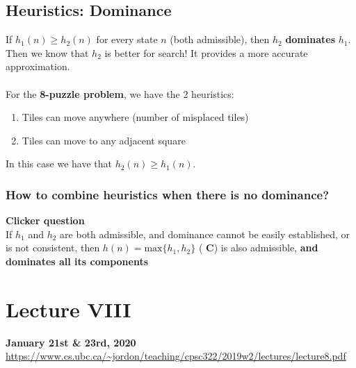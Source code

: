 \documentclass{article}
\theoremstyle{definition}
\begin{document}
\subsection*{Heuristics: Dominance}
If $ h_1(n) \geq h_2(n) $ for every state $ n $ (both admissible), then $ h_2 $ \textbf{\color{blue} dominates} $ h_1 $. Then we know that $ h_2 $ is better for search! It provides a more accurate approximation. \\ \\
For the \textbf{8-puzzle problem}, we have the 2 heuristics:
\begin{enumerate}
	\item Tiles can move anywhere (number of misplaced tiles)
	\item Tiles can move to any adjacent square
\end{enumerate}
In this case we have that $ h_2(n) \geq h_1(n) $. 

\subsubsection*{How to combine heuristics when there is no dominance?}
\textbf{\color{Dandelion} Clicker question}\\ If $ h_1 $ and $ h_2 $ are both admissible, and dominance cannot be easily established, or is not consistent, then $ h(n) = \text{max}\{h_1, h_2\} $ (\textbf{\color{Dandelion} C}) is also admissible, \textbf{\color{blue} and dominates all its components}












\newpage
\section*{Lecture VIII}
\textbf{January 21st \& 23rd, 2020} \\
\url{https://www.cs.ubc.ca/~jordon/teaching/cpsc322/2019w2/lectures/lecture8.pdf}
\end{document}
